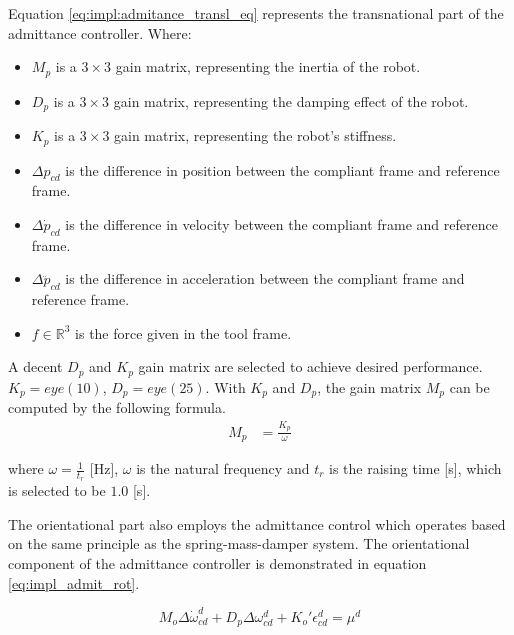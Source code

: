 Equation \ref{eq:impl:admitance_transl_eq} represents the transnational part of the admittance controller. 
Where:
\begin{itemize}
    \item $M_p$ is a $3\times3$ gain matrix, representing the inertia  of the robot.
    \item $D_p$ is a $3\times3$ gain matrix, representing the damping effect of the robot.
    \item $K_p$ is a $3\times3$ gain matrix, representing the robot's stiffness.
    \item $\Delta p_{cd}$ is the difference in position between the compliant frame and reference frame.
    \item $\Delta\dot{p}_{cd}$ is the difference in velocity between the compliant frame and reference frame.
    \item $\Delta\ddot{p}_{cd}$ is the difference in acceleration between the compliant frame and reference frame.
    \item $f\in\mathds{R}^3$ is the force given in the tool frame.
\end{itemize}

A decent $D_p$ and $K_p$ gain matrix are selected to achieve desired performance. $K_p = eye(10)$, $D_p = eye(25)$. 
With $K_p$ and $D_p$, the gain matrix $M_p$ can be computed by the following formula.
\begin{align}
    M_p &= \frac{K_p}{\omega} \label{eq:impl:M_p}
\end{align}

where $\omega = \frac{1}{t_r}$ [Hz], $\omega$ is the natural frequency and $t_r$ is the raising time [s], which is selected to be $1.0$ [s]. 

The orientational part also employs the admittance control which operates based on the same principle as the spring-mass-damper system.
The orientational component of the admittance controller is demonstrated in equation \ref{eq:impl_admit_rot}.

\begin{equation}
M_o\Delta\dot{\omega}_{cd}^d+D_p\Delta{\omega}_{cd}^d+K_o' \epsilon_{cd}^d = \mu^d
    \label{eq:impl_admit_rot}
\end{equation}

